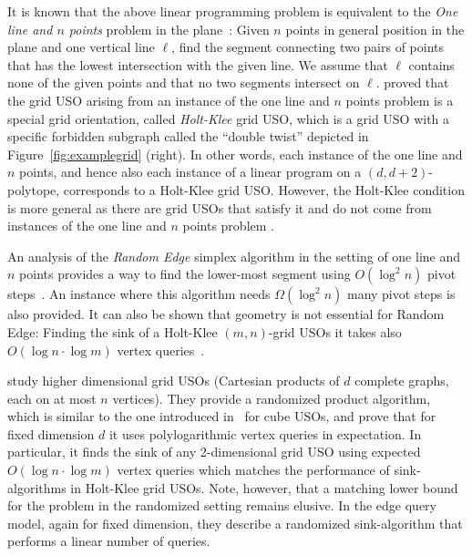 \documentclass[runningheads,a4paper]{llncs}
\newcommand{\AT}[1]{\marginpar{\parbox{3.6cm}{{\small {\bf AT:} #1}}}} %
\newcommand{\sinkalg}{sink-algorithm\xspace}
\newcommand{\sinkalgs}{sink-algorithms\xspace}
\begin{document}
It is known that the above linear programming problem is equivalent to the \emph{One line and $n$ points} problem in the plane~\cite{linepoint,welzl2001entering}:
Given $n$ points in general position in the plane and one vertical line $\ell$, find the segment connecting two pairs of points that has the lowest intersection with the given line. 
We assume that $\ell$ contains none of the given points and that no two segments intersect on $\ell$.
\citet{linepoint} proved that the grid USO arising from an instance of the one line and $n$ points problem is a special grid orientation, called \emph{Holt-Klee} grid USO, which is a grid USO with a specific forbidden subgraph called the ``double twist'' depicted in Figure~\ref{fig:examplegrid} (right). In other words, each instance of the one line and $n$ points, and hence also each instance of a linear program on a $(d, d+2)$-polytope, corresponds to a Holt-Klee grid USO. 
However, the Holt-Klee condition is more general as there are grid USOs that satisfy it and  do not come from instances of the one line and $n$ points problem \cite{grid05}. 

An analysis of the \emph{Random Edge} simplex algorithm in the setting of one line and $n$ points provides a way to find the lower-most segment using $O(\log^2 n )$ pivot steps~\cite{linepoint}. 
An instance where this algorithm needs $\Omega(\log^2 n )$ many pivot steps is also provided. 
It can also be shown that geometry is not essential for Random Edge: Finding the sink of a Holt-Klee $(m,n)$-grid USOs it takes also $O(\log n\cdot\log m)$ vertex queries~\cite{grid05,falkthesis}. 


\citet{grid08} study higher dimensional grid USOs (Cartesian products of $d$ complete graphs, each on at most $n$ vertices). 
They provide a randomized product algorithm, which is similar to the one introduced in~\cite{SW} for cube USOs, and prove that for fixed dimension $d$ it uses polylogarithmic vertex queries in expectation. 
In particular, it finds the sink of any 2-dimensional grid USO using expected $O(\log n \cdot \log m)$ vertex queries which matches the performance of \sinkalgs in Holt-Klee grid USOs. Note, however, that a matching lower bound for the problem in the randomized setting remains elusive.
In the edge query model, again for fixed dimension, they describe a randomized \sinkalg that performs a linear number of queries.
\end{document}
